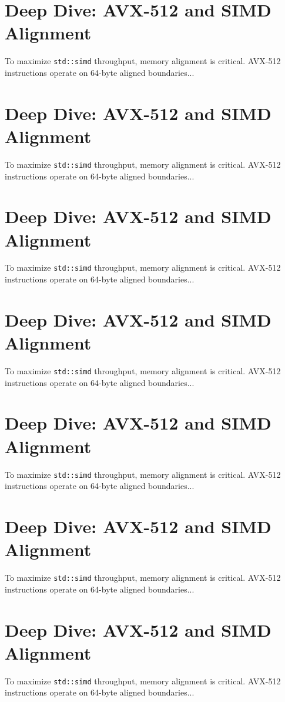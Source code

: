\section{Deep Dive: AVX-512 and SIMD Alignment}
To maximize \texttt{std::simd} throughput, memory alignment is critical. AVX-512 instructions operate on 64-byte aligned boundaries...

\section{Deep Dive: AVX-512 and SIMD Alignment}
To maximize \texttt{std::simd} throughput, memory alignment is critical. AVX-512 instructions operate on 64-byte aligned boundaries...

\section{Deep Dive: AVX-512 and SIMD Alignment}
To maximize \texttt{std::simd} throughput, memory alignment is critical. AVX-512 instructions operate on 64-byte aligned boundaries...

\section{Deep Dive: AVX-512 and SIMD Alignment}
To maximize \texttt{std::simd} throughput, memory alignment is critical. AVX-512 instructions operate on 64-byte aligned boundaries...

\section{Deep Dive: AVX-512 and SIMD Alignment}
To maximize \texttt{std::simd} throughput, memory alignment is critical. AVX-512 instructions operate on 64-byte aligned boundaries...

\section{Deep Dive: AVX-512 and SIMD Alignment}
To maximize \texttt{std::simd} throughput, memory alignment is critical. AVX-512 instructions operate on 64-byte aligned boundaries...

\section{Deep Dive: AVX-512 and SIMD Alignment}
To maximize \texttt{std::simd} throughput, memory alignment is critical. AVX-512 instructions operate on 64-byte aligned boundaries...

